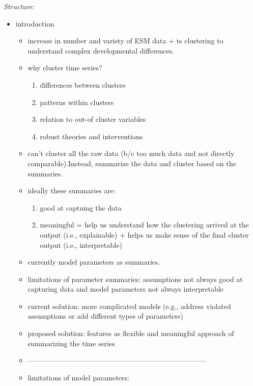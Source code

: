 \documentclass[man, 12pt, a4paper, mask, floatsintext]{apa7}
\theoremstyle{break}
\theoremstyle{plain}
\begin{document}
\begin{mdframed}[style=mdfbox]
\noindent\center\textit{Structure}:
\begin{itemize}[nosep]
    \item introduction
    \begin{itemize}[nosep]
        \item increase in number and variety of ESM data + ts clustering to understand complex developmental differences.
        \item why cluster time series? 
        \begin{enumerate}[nosep]
            \item differences between clusters
            \item patterns within clusters
            \item relation to out-of cluster variables
            \item robust theories and interventions
        \end{enumerate}
        \item can't cluster all the raw data (b/c too much data and not directly comparable).Instead, summarize the data and cluster based on the summaries.
        \item ideally these summaries are:
        \begin{enumerate}[nosep]
            \item good at captuing the data
            \item meaningful = help us understand how the clustering arrived at the output (i.e., explainable) + helps us make sense of the final cluster output (i.e., interpretable)
        \end{enumerate}
        \item currently model parameters as summaries.
        \item limitations of parameter summaries: assumptions not always good at capturing data and model parameters not always interpretable
        \item current solution: more complicated models (e.g., address violated assumptions or add different types of parameters)
        \item proposed solution: features as flexible and meaningful approach of summarizing the time series
        \item ---------------------------------------------------------------------------
        \item limitations of model parameters: 
        \begin{itemize}[nosep]

\end{itemize}
\end{itemize}
\end{itemize}
\end{mdframed}
\end{document}
